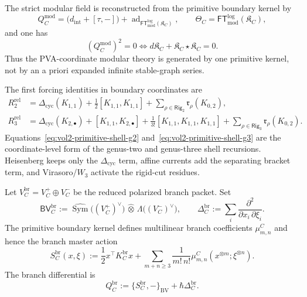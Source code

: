 \begin{proposition}
\label{prop:vol2-primitive-reconstruction}
The strict modular field is reconstructed from the primitive boundary kernel by
\[
Q^{\mathrm{mod}}_C
=
\bigl(d_{\mathrm{int}}+[\tau,-]\bigr)
+
\operatorname{ad}_{\mathsf{FT}^{\log}_{\mathrm{mod}}(\mathfrak K_C)},
\qquad
\Theta_C=\mathsf{FT}^{\log}_{\mathrm{mod}}(\mathfrak K_C),
\]
and one has
\[
(Q^{\mathrm{mod}}_C)^2=0
\iff
d\mathfrak K_C+\mathfrak K_C\star\mathfrak K_C=0.
\]
Thus the PVA-coordinate modular theory is generated by one primitive kernel, not by an a priori
expanded infinite stable-graph series.
\end{proposition}

\begin{computation}
\label{comp:vol2-primitive-shell-equations}
The first forcing identities in boundary coordinates are
\begin{align}
\label{eq:vol2-primitive-shell-g2}
R_2^{\mathrm{rel}}
&=
\Delta_{\mathrm{cyc}}(K_{1,1})
+\frac12[K_{1,1},K_{1,1}]
+\sum_{\rho\in\mathsf{Rig}_2}\mathfrak r_\rho(K_{0,2}),
\\
\label{eq:vol2-primitive-shell-g3}
R_3^{\mathrm{rel}}
&=
\Delta_{\mathrm{cyc}}(K_{2,\bullet})
+[K_{1,1},K_{2,\bullet}]
+\frac1{3!}[K_{1,1},K_{1,1},K_{1,1}]
+\sum_{\rho\in\mathsf{Rig}_3}\mathfrak r_\rho(K_{0,2}).
\end{align}
Equations~\eqref{eq:vol2-primitive-shell-g2} and~\eqref{eq:vol2-primitive-shell-g3}
are the coordinate-level form of the genus-two and genus-three shell recursions.
Heisenberg keeps only the $\Delta_{\mathrm{cyc}}$ term, affine currents add the separating
bracket term, and Virasoro/$W_3$ activate the rigid-cut residues.
\end{computation}

\begin{definition}
\label{def:vol2-branch-bv-action}
Let $V^{\mathrm{br}}_C=V_C^+\oplus V_C^-$ be the reduced polarized branch packet.
Set
\[
\mathsf{BV}^{\mathrm{br}}_C
:=
\widehat{\operatorname{Sym}}\bigl((V_C^+)^\vee\bigr)
\,\widehat\otimes\,
\Lambda\bigl((V_C^-)^\vee\bigr),
\qquad
\Delta^{\mathrm{br}}_C
:=
\sum_i\frac{\partial^2}{\partial x_i\,\partial\xi_i}.
\]
The primitive boundary kernel defines multilinear branch coefficients $\mu_{m,n}^C$ and
hence the branch master action
\begin{equation}
\label{eq:vol2-branch-master-action}
S^{\mathrm{br}}_C(x,\xi)
:=
\frac12 x^\top K_C^{\mathrm{br}}x
+
\sum_{m+n\ge 3}\frac{1}{m!\,n!}\mu_{m,n}^C(x^{\otimes m};\xi^{\otimes n}).
\end{equation}
The branch differential is
\[
Q^{\mathrm{br}}_C
:=
\{S^{\mathrm{br}}_C,-\}_{\mathrm{BV}}+\hbar\Delta^{\mathrm{br}}_C.
\]
\end{definition}

